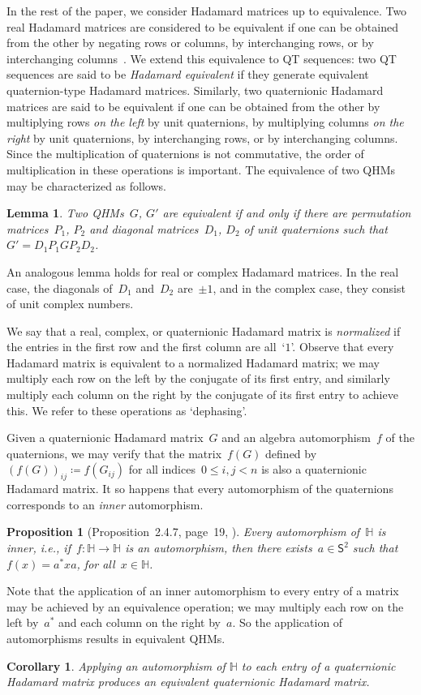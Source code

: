 \documentclass[12pt]{article}
\numberwithin{equation}{section}
\newtheorem{corollary}[theorem]{Corollary}
\newtheorem{proposition}[theorem]{Proposition}
\newtheorem{lemma}[theorem]{Lemma}
\newcommand{\HH}{\mathbb{H}}
\newcommand{\eqdef}{\coloneqq}
\newcommand{\qsphere}{{\mathsf S}}
\begin{document}
In the rest of the paper, we consider Hadamard matrices up to equivalence. Two real Hadamard matrices are considered to be equivalent if one can be obtained from the other by negating rows or columns, by interchanging rows, or by interchanging columns~\cite{McKay1979}.
We extend this equivalence to QT sequences: two QT sequences are said to be \emph{Hadamard equivalent}
if they generate equivalent quaternion-type Hadamard matrices.
Similarly, two quaternionic Hadamard matrices are said to be equivalent if one can be obtained from the other by multiplying rows \emph{on the left\/} by unit quaternions, by multiplying columns \emph{on the right\/} by unit quaternions, by interchanging rows, or by interchanging columns. Since the multiplication of quaternions is not commutative, the order of multiplication in these operations is important. The equivalence of two QHMs may be characterized as follows.
\begin{lemma}
\label{lem-equivalence}
Two QHMs~$G$, $G'$ are equivalent if and only if there are permutation matrices~$P_1$, $P_2$ and diagonal matrices~$D_1$, $D_2$ of unit quaternions such that~$G' = D_1 P_1 G P_2 D_2$.
\end{lemma}
An analogous lemma holds for real or complex Hadamard matrices. In the real case, the diagonals of~$D_1$ and~$D_2$ are~$\pm 1$, and in the complex case, they consist of unit complex numbers.

We say that a real, complex, or quaternionic Hadamard matrix is \emph{normalized\/} if the entries in the first row and the first column are all~`$1$'. Observe that every Hadamard matrix is equivalent to a normalized Hadamard matrix; we may multiply each row on the left by the conjugate of its first entry, and similarly multiply each column on the right by the conjugate of its first entry to achieve this. We refer to these operations as `dephasing'.

Given a quaternionic Hadamard matrix~$G$ and an algebra automorphism~$f$ of the quaternions, we may verify that the matrix~$f(G)$ defined by~$(f(G))_{ij} \eqdef f(G_{ij})$ for all indices~$0 \le i,j < n$ is also a quaternionic Hadamard matrix. It so happens that every automorphism of the quaternions corresponds to an \emph{inner\/} automorphism.
\begin{proposition}[Proposition~2.4.7, page~19, \cite{Rodman14-quaternion-linear-algebra}]
\label{prop-inner-aut}
Every automorphism of~$\HH$ is \emph{inner\/}, i.e., if~$f \colon \HH \rightarrow \HH$ is an automorphism, then there exists~$a \in \qsphere^2$ such that~$f(x) = a^* x a$, for all~$x \in \HH$. 
\end{proposition}
Note that the application of an inner automorphism to every entry of a matrix may be achieved by an equivalence operation; we may multiply each row on the left by~$a^*$ and each column on the right by~$a$. So the application of automorphisms results in equivalent QHMs.
\begin{corollary}
\label{cor:automorphism-equiv}
Applying an automorphism of\/ $\HH$ to each entry of a quaternionic Hadamard matrix
produces an equivalent quaternionic Hadamard matrix.
\end{corollary}
\end{document}
